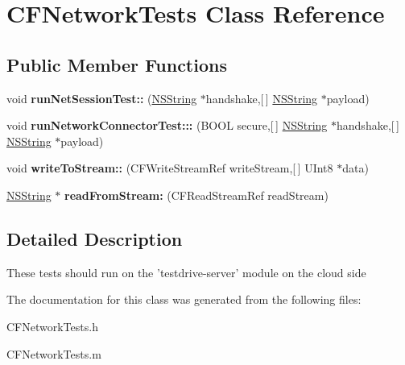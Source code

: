 \hypertarget{interface_c_f_network_tests}{
\section{\-C\-F\-Network\-Tests \-Class \-Reference}
\label{interface_c_f_network_tests}
}
\subsection*{\-Public \-Member \-Functions}
\begin{DoxyCompactItemize}
\item 
\hypertarget{interface_c_f_network_tests_a759ce7d77f13115dc3529339d1b1f966}{
void {\bfseries run\-Net\-Session\-Test\-::} (\hyperlink{class_n_s_string}{\-N\-S\-String} $\ast$handshake,\mbox{[}$\,$\mbox{]} \hyperlink{class_n_s_string}{\-N\-S\-String} $\ast$payload)}
\label{interface_c_f_network_tests_a759ce7d77f13115dc3529339d1b1f966}

\item 
\hypertarget{interface_c_f_network_tests_af43c1692b1223ca97714904594e9add2}{
void {\bfseries run\-Network\-Connector\-Test\-:::} (\-B\-O\-O\-L secure,\mbox{[}$\,$\mbox{]} \hyperlink{class_n_s_string}{\-N\-S\-String} $\ast$handshake,\mbox{[}$\,$\mbox{]} \hyperlink{class_n_s_string}{\-N\-S\-String} $\ast$payload)}
\label{interface_c_f_network_tests_af43c1692b1223ca97714904594e9add2}

\item 
\hypertarget{interface_c_f_network_tests_a9fefcb0d9484f0b4969512758b1c2728}{
void {\bfseries write\-To\-Stream\-::} (\-C\-F\-Write\-Stream\-Ref write\-Stream,\mbox{[}$\,$\mbox{]} \-U\-Int8 $\ast$data)}
\label{interface_c_f_network_tests_a9fefcb0d9484f0b4969512758b1c2728}

\item 
\hypertarget{interface_c_f_network_tests_a30dca2e6bea4cbb9ebe4035c010d83e3}{
\hyperlink{class_n_s_string}{\-N\-S\-String} $\ast$ {\bfseries read\-From\-Stream\-:} (\-C\-F\-Read\-Stream\-Ref read\-Stream)}
\label{interface_c_f_network_tests_a30dca2e6bea4cbb9ebe4035c010d83e3}

\end{DoxyCompactItemize}


\subsection{\-Detailed \-Description}
\-These tests should run on the 'testdrive-\/server' module on the cloud side 

\-The documentation for this class was generated from the following files\-:\begin{DoxyCompactItemize}
\item 
\-C\-F\-Network\-Tests.\-h\item 
\-C\-F\-Network\-Tests.\-m\end{DoxyCompactItemize}
